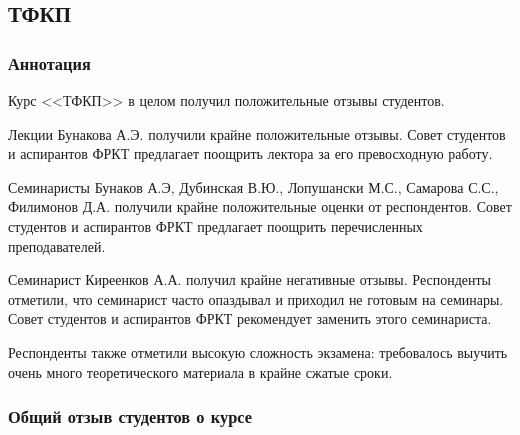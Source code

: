 \subsection{ТФКП}
	
	\subsubsection{Аннотация}

	    Курс <<ТФКП>> в целом получил положительные отзывы студентов.

        Лекции Бунакова А.Э. получили крайне положительные отзывы. Совет студентов и аспирантов ФРКТ предлагает поощрить лектора за его превосходную работу.

        Семинаристы Бунаков А.Э, Дубинская В.Ю., Лопушански М.С., Самарова С.С., Филимонов Д.А. получили крайне положительные оценки от респондентов. Совет студентов и аспирантов ФРКТ предлагает поощрить перечисленных преподавателей. 

        Семинарист Киреенков А.А. получил крайне негативные отзывы. Респонденты отметили, что семинарист часто опаздывал и приходил не готовым на семинары. Совет студентов и аспирантов ФРКТ рекомендует заменить этого семинариста.

        Респонденты также отметили высокую сложность экзамена: требовалось выучить очень много теоретического материала в крайне сжатые сроки.

	\subsubsection{Общий отзыв студентов о курсе}

